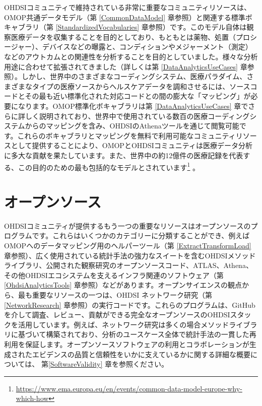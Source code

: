 \documentclass[
  11pt]{book}
\theoremstyle{definition}
\theoremstyle{definition}
\theoremstyle{definition}
\theoremstyle{definition}
\theoremstyle{remark}
\begin{document}
OHDSIコミュニティで維持されている非常に重要なコミュニティリソースは、OMOP共通データモデル（第 \ref{CommonDataModel} 章参照）と関連する標準ボキャブラリ（第 \ref{StandardizedVocabularies} 章参照）です。このモデル自体は観察医療データを収集することを目的としており、もともとは薬物、処置（プロシージャー）、デバイスなどの曝露と、コンディションやメジャーメント（測定）などのアウトカムとの関連性を分析することを目的としていました。様々な分析用途に合わせて拡張されてきました（詳しくは第 \ref{DataAnalyticsUseCases} 章参照）。しかし、世界中のさまざまなコーディングシステム、医療パラダイム、さまざまなタイプの医療ソースからヘルスケアデータを調和させるには、ソースコードとその最も近い標準化された対応コードとの間の膨大な「マッピング」が必要になります。OMOP標準化ボキャブラリは第 \ref{DataAnalyticsUseCases} 章でさらに詳しく説明されており、世界中で使用されている数百の医療コーディングシステムからのマッピングを含み、OHDSIのAthenaツールを通じて閲覧可能です。これらのボキャブラリとマッピングを無料で利用可能なコミュニティリソースとして提供することにより、OMOPとOHDSIコミュニティは医療データ分析に多大な貢献を果たしています。また、世界中の約12億件の医療記録を代表する、この目的のための最も包括的なモデルとされています\footnote{\url{https://www.ema.europa.eu/en/events/common-data-model-europe-why-which-how}} \citep{garza_2016}。

\section{オープンソース}\label{ux30aaux30fcux30d7ux30f3ux30bdux30fcux30b9}


OHDSIコミュニティが提供するもう一つの重要なリソースはオープンソースのプログラムです。これらはいくつかのカテゴリーに分類することができ、例えばOMOPへのデータマッピング用のヘルパーツール（第 \ref{ExtractTransformLoad} 章参照）、広く使用されている統計手法の強力なスイートを含むOHDSIメソッドライブラリ、公開された観察研究のオープンソースコード、ATLAS、Athena、その他OHDSIエコシステムを支えるインフラ関連のソフトウェア（第 \ref{OhdsiAnalyticsTools} 章参照）などがあります。オープンサイエンスの観点から、最も重要なリソースの一つは、OHDSI ネットワーク研究（第 \ref{NetworkResearch} 章参照）の実行コードです。これらのプログラムは、GitHubを介して調査、レビュー、貢献ができる完全なオープンソースのOHDSIスタックを活用しています。例えば、ネットワーク研究は多くの場合メソッドライブラリに基づいて構築されており、分析のユースケース全体で統計手法の一貫した再利用を保証します。オープンソースソフトウェアの利用とコラボレーションが生成されたエビデンスの品質と信頼性をいかに支えているかに関する詳細な概要については、 第\ref{SoftwareValidity} 章を参照ください。
\end{document}
